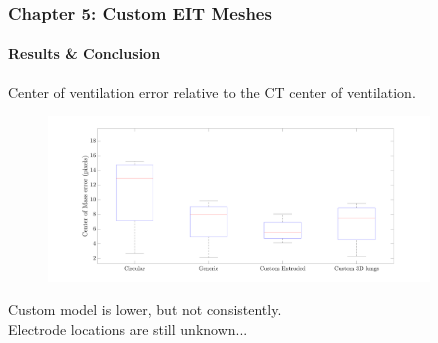 \documentclass[10pt,    %
    english,            %
    xcolor=table,       %
    envcountsect,        %
    aspectratio=1610
]{beamer}
\begin{document}
\begin{frame}
	\frametitle{Chapter 5: Custom EIT Meshes}
	\framesubtitle{Results \& Conclusion}   
	Center of ventilation error relative to the CT center of ventilation.
	\\ \vspace{2mm}
	\begin{figure}[H]
		\centering
		\includegraphics[width=0.9\textwidth,trim={0 1.5cm 0 1.5cm},clip]{error_boxplot.pdf}
	\end{figure}%
	\vspace{1mm}
	Custom model is lower, but not consistently. 
	\\ \vspace{5mm}
	\centering
	\alert{Electrode locations are still unknown...}
\end{frame}
\end{document}
